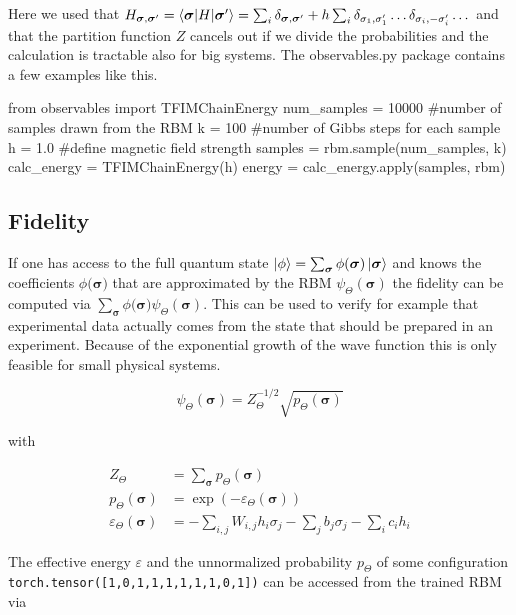 \documentclass[submission, Phys]{SciPost}
\begin{document}
Here we used that $H_{\bm{\sigma}, \bm{\sigma}'}  = \braket{\bm{\sigma} | H | \bm{\sigma}'} = \sum_i \delta_{\bm{\sigma}, \bm{\sigma}'} + h \sum_i \delta_{\sigma_1, \sigma_1'} \dots \delta_{\sigma_i, -\sigma_i'} \dots$ and that the partition function $Z$ cancels out if we divide the probabilities and the calculation is tractable also for big systems.
The observables.py package contains a few examples like this.

\begin{python}
from observables import TFIMChainEnergy
num_samples = 10000 #number of samples drawn from the RBM
k = 100 #number of Gibbs steps for each sample
h = 1.0 #define magnetic field strength
samples = rbm.sample(num_samples, k)
calc_energy = TFIMChainEnergy(h)
energy = calc_energy.apply(samples, rbm)
\end{python}

\subsection{Fidelity}

If one has access to the full quantum state $\ket{\phi} = \sum_{\bm{\sigma}} \phi(\bm{\sigma}) \ket{ \bm{\sigma}}$ and knows the coefficients $\phi(\bm{\sigma)}$ that are approximated by the RBM $\psi_{\Theta}(\bm{\sigma})$ the fidelity can be computed via $\sum_{\bm{\sigma}} \phi(\bm{\sigma)} \psi_{\Theta}(\bm{\sigma})$. This can be used to verify for example that experimental data actually comes from the state that should be prepared in an experiment. Because of the exponential growth of the wave function this is only feasible for small physical systems.

\begin{equation}
\psi_{\Theta}(\bm{\sigma}) = Z_{\Theta}^{-1/2} \sqrt{p_{\Theta} (\bm{\sigma})}
\end{equation}

with

\begin{align}
Z_{\Theta} &= \sum_{\bm{\sigma}} p_{\Theta}(\bm{\sigma}) \\
p_{\Theta} (\bm{\sigma}) &= \exp{ (- \varepsilon_{\Theta} (\bm{\sigma}))} \\
\varepsilon_{\Theta} (\bm{\sigma}) &= -\sum_{i,j} W_{i,j} h_i \sigma_j - \sum_j b_j \sigma_j - \sum_i c_i h_i
\end{align}


The effective energy $\varepsilon$ and the unnormalized probability $p_{\Theta}$ of some configuration 
\verb|torch.tensor([1,0,1,1,1,1,1,1,0,1])| can be accessed from the trained RBM via
\end{document}
